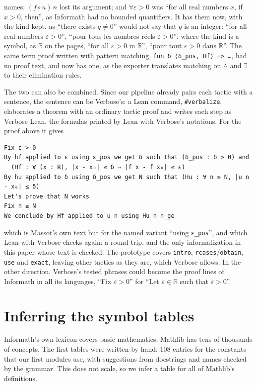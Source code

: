 \documentclass{easychair}
\newcommand{\ttt}[1]{\texttt{#1}}
\begin{document}
names; $(f \circ u)\, n$ lost its argument; and $\forall \varepsilon > 0$ was ``for all real
numbers $x$, if $x > 0$, then'', as Informath had no bounded quantifiers. It has them now, with the
kind kept, as ``there exists $q \neq 0$'' would not say that $q$ is an integer: ``for all real
numbers $\varepsilon > 0$'', ``pour tous les nombres réels $\varepsilon > 0$''; where the kind is a
symbol, as $\mathbb{R}$ on the pages, ``for all $\varepsilon > 0$ in $\mathbb{R}$'', ``pour tout
$\varepsilon > 0$ dans $\mathbb{R}$''. The same term proof written with pattern matching,
\ttt{fun δ ⟨δ\_pos, Hf⟩ => \ldots}, had no proof text, and now has one, as the exporter translates
matching on $\wedge$ and $\exists$ to their elimination rules.

The two can also be combined. Since our pipeline already pairs each tactic with a sentence, the
sentence can be Verbose's: a Lean command, \ttt{\#verbalize}, elaborates a theorem with an
ordinary tactic proof and writes each step as Verbose Lean, the formulas printed by Lean with
Verbose's notations. For the proof above it gives
\begin{lstlisting}
Fix ε > 0
By hf applied to ε using ε_pos we get δ such that (δ_pos : δ > 0) and
  (Hf : ∀ (x : ℝ), |x - x₀| ≤ δ ⇒ |f x - f x₀| ≤ ε)
By hu applied to δ using δ_pos we get N such that (Hu : ∀ n ≥ N, |u n - x₀| ≤ δ)
Let's prove that N works
Fix n ≥ N
We conclude by Hf applied to u n using Hu n n_ge
\end{lstlisting}
which is Massot's own text but for the named variant ``using \ttt{ε\_pos}'', and which Lean with
Verbose checks again: a round trip, and the only informalization in this paper whose text is
checked. The prototype covers \ttt{intro}, \ttt{rcases}/\ttt{obtain}, \ttt{use} and \ttt{exact},
leaving other tactics as they are, which Verbose allows. In the other direction, Verbose's tested
phrases could become the proof lines of Informath in all its languages, ``Fix $\varepsilon > 0$''
for ``Let $\varepsilon \in \mathbb{R}$ such that $\varepsilon > 0$''.

\section{Inferring the symbol tables}
\label{sec:tables}

Informath's own lexicon covers basic mathematics; Mathlib has tens of thousands of concepts.
The first tables were written by hand: 108 entries for the constants that our first modules use,
with suggestions from docstrings and names checked by the grammar. This does not scale, so we
infer a table for all of Mathlib's definitions.
\end{document}
